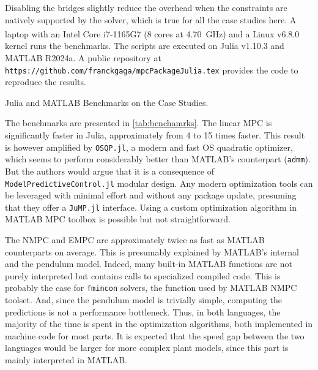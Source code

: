 Disabling the bridges slightly reduce the overhead when the constraints are natively supported by the solver, which is true for all the case studies here. A laptop with an Intel\textsuperscript{\textregistered} Core\textsuperscript{\texttrademark} i7-1165G7 (8 cores at \SI{4.70}{\giga\hertz}) and a Linux v6.8.0 kernel runs the benchmarks. The scripts are executed on Julia v1.10.3 and MATLAB R2024a. A public repository at \texttt{https://github.com/franckgaga/mpcPackageJulia.tex} provides the code to reproduce the results. 

\begin{table}
    \centering
    \caption{Julia and MATLAB Benchmarks on the Case Studies.}
    \label{tab:benchamrks}
    \centering
	
\end{table}

The benchmarks are presented in \cref{tab:benchamrks}. The linear MPC is significantly faster in Julia, approximately from 4 to 15 times faster. This result is however amplified by \texttt{OSQP.jl}, a modern and fast OS quadratic optimizer, which seems to perform considerably better than MATLAB's counterpart (\texttt{admm}). But the authors would argue that it is a consequence of \texttt{ModelPredictiveControl.jl} modular design. Any modern optimization tools can be leveraged with minimal effort and without any package update, presuming that they offer a \texttt{JuMP.jl} interface. Using a custom optimization algorithm in MATLAB MPC toolbox is possible but not straightforward. 

The NMPC and EMPC are approximately twice as fast as MATLAB counterparts on average. This is presumably explained by MATLAB's internal and the pendulum model. Indeed, many built-in MATLAB functions are not purely interpreted but contains calls to specialized compiled code. This is probably the case for \texttt{fmincon} solvers, the function used by MATLAB NMPC toolset. And, since the pendulum model is trivially simple, computing the predictions is not a performance bottleneck. Thus, in both languages, the majority of the time is spent in the optimization algorithms, both implemented in machine code for most parts. It is expected that the speed gap between the two languages would be larger for more complex plant models, since this part is mainly interpreted in MATLAB.
